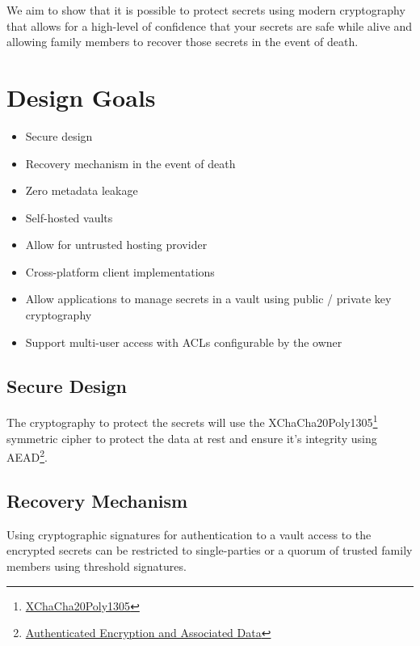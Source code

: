 \documentclass[a4paper,titlepage,oneside]{article}
\renewcommand{\paragraph}{\small}
\begin{document}
\paragraph{We aim to show that it is possible to protect secrets using modern cryptography that allows for a high-level of confidence that your secrets are safe while alive and allowing family members to recover those secrets in the event of death.}

\section{Design Goals}

\begin{itemize}
  \item Secure design
  \item Recovery mechanism in the event of death
  \item Zero metadata leakage
  \item Self-hosted vaults
  \item Allow for untrusted hosting provider
  \item Cross-platform client implementations
  \item Allow applications to manage secrets in a vault using public / private key cryptography
  \item Support multi-user access with ACLs configurable by the owner
\end{itemize}

\subsection{Secure Design}

\paragraph{The cryptography to protect the secrets will use the XChaCha20Poly1305\footnote{\href{https://en.wikipedia.org/wiki/ChaCha20-Poly1305}{XChaCha20Poly1305}} symmetric cipher to protect the data at rest and ensure it's integrity using AEAD\footnote{\href{https://en.wikipedia.org/wiki/Authenticated_encryption}{Authenticated Encryption and Associated Data}}.}

\subsection{Recovery Mechanism}

\paragraph{Using cryptographic signatures for authentication to a vault access to the encrypted secrets can be restricted to single-parties or a quorum of trusted family members using threshold signatures.}
\end{document}
